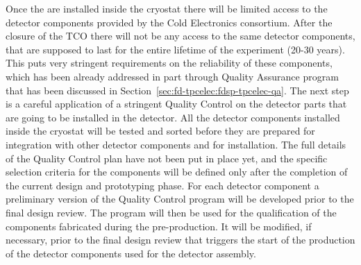 Once the  are installed inside the cryostat there will
be limited access to the detector components provided by the Cold
Electronics consortium. After the closure of the TCO there will not
be any access to the same detector components, that are supposed to
last for the entire lifetime of the experiment (20-30 years). This
puts very stringent requirements on the reliability of these 
components, which has been already addressed in part through 
Quality Assurance program that has been discussed in
Section~\ref{sec:fd-tpcelec:fdsp-tpcelec-qa}. The next step is
a careful application of a stringent Quality Control on the 
detector parts that are going to be installed in the detector.
All the detector components installed inside the cryostat will
be tested and sorted before they are prepared for integration
with other detector components and for installation. The full
details of the Quality Control plan have not been put in place
yet, and the specific selection criteria for the components will
be defined only after the completion of the current design and
prototyping phase. For each detector component a preliminary
version of the Quality Control program will be developed prior
to the final design review. The program will then be used for
the qualification of the components fabricated during the 
pre-production. It will be modified, if necessary, prior to the final
design review that triggers the start of the production of the
detector components used for the detector assembly.

